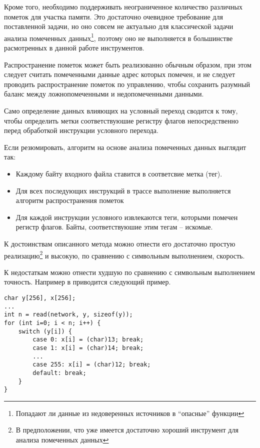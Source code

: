Кроме того, необходимо поддерживать неограниченное количество различных пометок для участка памяти. Это достаточно очевидное требование для поставленной задачи, но оно совсем не актуально для классической задачи анализа помеченных данных\footnote{Попадают ли данные из недоверенных источников в ``опасные'' функции}, поэтому оно не выполняется в большинстве расмотренных в данной работе инструментов.

Распространение пометок может быть реализованно обычным образом, при этом следует считать помеченными данные адрес которых помечен, и не следует проводить распространение пометок по управлению, чтобы сохранить разумный баланс между ложнопомеченными и недопомеченными данными.

Само определение данных влияющих на условный переход сводится к тому, чтобы определить метки соответствуюшие регистру флагов непосредственно перед обработкой инструкции условного перехода.

Если резюмировать, алгоритм на основе анализа помеченных данных выглядит так:

\begin{itemize}
  \item Каждому байту входного файла ставится в соответсвие метка (тег).
  \item Для всех последующих инструкций в трассе выполнение выполняется алгоритм распространения пометок
  \item Для каждой инструкции условного извлекаются теги, которыми помечен регистр флагов. Байты, соответствуюшие этим тегам -- искомые.
\end{itemize}

К достоинствам описанного метода можно отнести его достаточно простую реализацию\footnote{В предположении, что уже имеется достаточно хороший инструмент для анализа помеченных данных} и высокую, по сравнению с символьным выполнением, скорость.

К недостаткам можно отнести худшую по сравнению с символьным выполнением точность. Например в \cite{Cavallaro07anti-taint-analysis:practical} приводится следующий пример.

\begin{lstlisting}[environoment=C_LANG,captionpos=b]
char y[256], x[256];
...
int n = read(network, y, sizeof(y));
for (int i=0; i < n; i++) {
    switch (y[i]) {
        case 0: x[i] = (char)13; break;
        case 1: x[i] = (char)14; break;
        ...
        case 255: x[i] = (char)12; break;
        default: break;
    }
}
\end{lstlisting}

